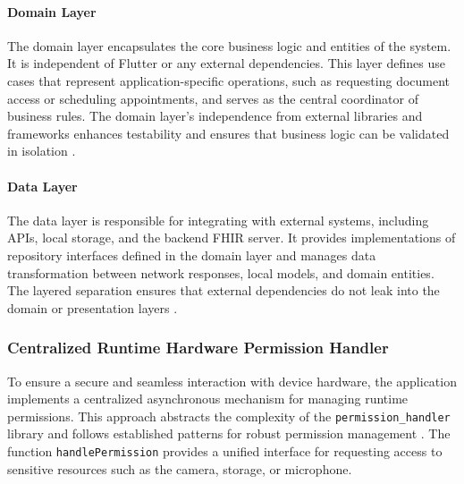 \paragraph{Domain Layer}
The domain layer encapsulates the core business logic and entities of the system. It is independent of Flutter or any external dependencies. This layer defines use cases that represent application-specific operations, such as requesting document access or scheduling appointments, and serves as the central coordinator of business rules. The domain layer’s independence from external libraries and frameworks enhances testability and ensures that business logic can be validated in isolation \cite{clean_arch_flutter}.

\paragraph{Data Layer}
The data layer is responsible for integrating with external systems, including APIs, local storage, and the backend FHIR server. It provides implementations of repository interfaces defined in the domain layer and manages data transformation between network responses, local models, and domain entities. The layered separation ensures that external dependencies do not leak into the domain or presentation layers \cite{clean_arch_flutter}.

\subsubsection{Centralized Runtime Hardware Permission Handler}
To ensure a secure and seamless interaction with device hardware, the application implements a centralized asynchronous mechanism for managing runtime permissions. This approach abstracts the complexity of the \texttt{permission\_handler} library and follows established patterns for robust permission management \cite{anthony2025permissions}. The function \texttt{handlePermission} provides a unified interface for requesting access to sensitive resources such as the camera, storage, or microphone.

